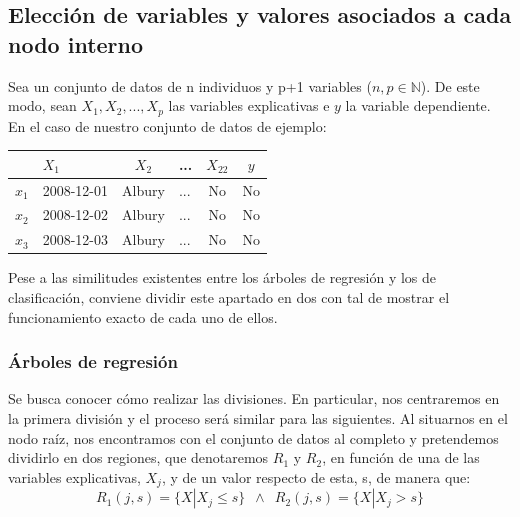 \documentclass[12pt,twoside]{article}
\begin{document}
\subsection{Elección de variables y valores asociados a cada nodo interno} \label{sec: subsec22}
Sea un conjunto de datos de n individuos y p+1 variables ($n,p \in \mathbb{N}$). De este modo, sean $X_1, X_2, ... , X_p$ las variables explicativas e $y$ la variable dependiente. En el caso de nuestro conjunto de datos de ejemplo:
\begin{table}[h]
\centering
\begin{tabular}{rcccc|c}
 & \multicolumn{1}{l}{$X_1$}         & $X_2$                        & ...                      & $X_{22}$ & $y$ \\ \hline
\multicolumn{1}{l|}{$x_1$} & \multicolumn{1}{r|}{2008-12-01} & \multicolumn{1}{l|}{Albury} & \multicolumn{1}{l|}{...} & No        & \multicolumn{1}{l|}{No} \\ \hline
\multicolumn{1}{l|}{$x_2$} & \multicolumn{1}{r|}{2008-12-02} & \multicolumn{1}{l|}{Albury} & \multicolumn{1}{l|}{...} & No        & \multicolumn{1}{l|}{No} \\ \hline
\multicolumn{1}{l|}{$x_3$} & \multicolumn{1}{r|}{2008-12-03} & \multicolumn{1}{l|}{Albury} & \multicolumn{1}{l|}{...} & No        & \multicolumn{1}{l|}{No} \\ \hline
\end{tabular}
\end{table}

Pese a las similitudes existentes entre los árboles de regresión y los de clasificación, conviene dividir este apartado en dos con tal de mostrar el funcionamiento exacto de cada uno de ellos.


\subsubsection{Árboles de regresión}
Se busca conocer cómo realizar las divisiones. En particular, nos centraremos en la primera división y el proceso será similar para las siguientes. Al situarnos en el nodo raíz, nos encontramos con el conjunto de datos al completo y pretendemos dividirlo en dos regiones, que denotaremos $R_1$ y $R_2$, en función de una de las variables explicativas, $X_j$, y de un valor respecto de esta, s, de manera que:
\begin{equation*}
R_1 (j,s) = \{ X | X_j \leq s \} \, \, \, \wedge \, \, \,  R_2 (j,s) = \{ X | X_j > s\}
\end{equation*}
\end{document}
